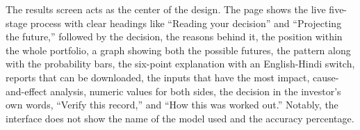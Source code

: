 The results screen acts as the center of the design. The page shows the live five-stage process with clear headings like “Reading your decision” and “Projecting the future,” followed by the decision, the reasons behind it, the position within the whole portfolio, a graph showing both the possible futures, the pattern along with the probability bars, the six-point explanation with an English-Hindi switch, reports that can be downloaded, the inputs that have the most impact, cause-and-effect analysis, numeric values for both sides, the decision in the investor’s own words, “Verify this record,” and “How this was worked out.” Notably, the interface does not show the name of the model used and the accuracy percentage.
